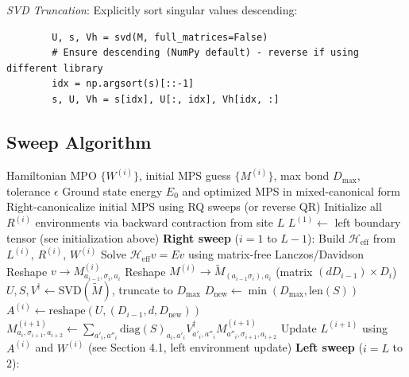 \documentclass[aps,prb,onecolumn,scriptaddress]{revtex4-2}
\newcommand{\eps}{\epsilon}
\begin{document}
	\textit{SVD Truncation}: Explicitly sort singular values descending:
	\begin{verbatim}
		U, s, Vh = svd(M, full_matrices=False)
		# Ensure descending (NumPy default) - reverse if using different library
		idx = np.argsort(s)[::-1]
		s, U, Vh = s[idx], U[:, idx], Vh[idx, :]
	\end{verbatim}
	
	\subsection{Sweep Algorithm}
	
\begin{algorithm}[H]
	\caption{SingleSiteDMRG (with Gauge Control)}
	\begin{algorithmic}[1]
		\Require Hamiltonian MPO $\{W^{(i)}\}$, initial MPS guess $\{M^{(i)}\}$, max bond $D_{\max}$, tolerance $\eps$
		\Ensure Ground state energy $E_0$ and optimized MPS in mixed-canonical form
		\State Right-canonicalize initial MPS using RQ sweeps (or reverse QR)
		\State Initialize all $R^{(i)}$ environments via backward contraction from site $L$
		\State $L^{(1)} \gets$ left boundary tensor (see initialization above)
		\State \textbf{Right sweep} ($i=1$ to $L-1$):
		\State Build $\mathcal{H}_{\text{eff}}$ from $L^{(i)}$, $R^{(i)}$, $W^{(i)}$
		\State Solve $\mathcal{H}_{\text{eff}} v = E v$ using matrix-free Lanczos/Davidson
		\State {}
		\State {}
		\State Reshape $v \to M^{(i)}_{a_{i-1},\sigma_i,a_i}$
		\State {}
		\State Reshape $M^{(i)} \to \tilde{M}_{(a_{i-1}\sigma_i), a_i}$ (matrix $(dD_{i-1}) \times D_i$)
		\State $U, S, V^\dagger \gets \text{SVD}(\tilde{M})$, truncate to $D_{\max}$
		\State $D_{\text{new}} \gets \min(D_{\max}, \text{len}(S))$ 
		\State $A^{(i)} \gets \text{reshape}(U, (D_{i-1}, d, D_{\text{new}}))$ 
		\State {}
		\State $M^{(i+1)}_{a_i,\sigma_{i+1},a_{i+2}} \gets \sum_{a'_i, a''_i} \text{diag}(S)_{a_i,a'_i} V^\dagger_{a'_i,a''_i} M^{(i+1)}_{a''_i,\sigma_{i+1},a_{i+2}}$
		\State Update $L^{(i+1)}$ using $A^{(i)}$ and $W^{(i)}$ (see Section 4.1, left environment update)
		\EndFor
		\State \textbf{Left sweep} ($i=L$ to $2$):

\end{algorithmic}
\end{algorithm}
\end{document}
